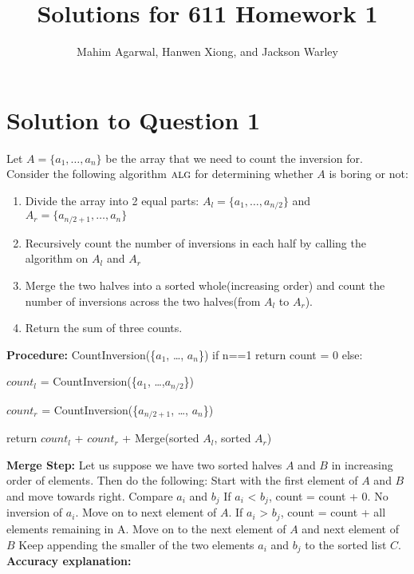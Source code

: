 \documentclass[11pt]{article}
\title{Solutions for 611 Homework 1}
\author{Mahim Agarwal, Hanwen Xiong, and Jackson Warley}
\newcommand{\alg}{\textsc{alg}}
\begin{document}
\maketitle

\section{Solution to Question 1}
Let $A = \{a_1, \dots, a_n\}$ be the array that we need to count the inversion for.
Consider the following algorithm $\alg$ for determining whether $A$ is boring or not:
\begin{enumerate}
  \item Divide the array into 2 equal parts: $A_l = \{a_1, \dots, a_{n/2}\}$ and $A_r = \{a_{n/2+1}, \dots, a_n\}$
  \item Recursively count the number of inversions in each half by calling the algorithm on $A_l$ and $A_r$
  \item Merge the two halves into a sorted whole(increasing order) and count the number of inversions across 
the two halves(from $A_l$ to $A_r$). 
\item Return the sum of three counts. \newline
 \end{enumerate}
{\bf Procedure:}\newline
CountInversion(\{$a_1$, \dots, $a_n$\}) \newline
if n==1 return count = 0 \newline
\newline
else:

 $count_l$ = CountInversion(\{$a_1$, \dots,$a_{n/2}$\}) 

 $count_r$ = CountInversion(\{$a_{n/2+1}$, \dots, $a_n$\}) 

return  $count_l$ + $count_r$ + Merge(sorted $A_l$, sorted $A_r$) 

{\bf Merge Step:} \newline
Let us suppose we have two sorted halves $A$ and $B$ in increasing order of elements. Then do the following: \newline
Start with the first element of $A$ and $B$ and move towards right. \newline
Compare $a_i$ and $b_j$ \newline
If $a_i$ < $b_j$, count = count + 0. No inversion of $a_i$. Move on to next element of $A$. \newline
If $a_i$ > $b_j$, count = count + all elements remaining in A. Move on to the next element of $A$ and next  element of $B$ \newline
Keep appending the smaller of the two elements $a_i$ and $b_j$ to the sorted list $C$. \newline
{\bf Accuracy explanation:}\newline
\end{document}
